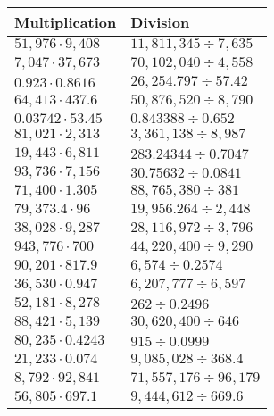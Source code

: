 \begin{longtable}[]{@{}ll@{}}
\toprule
Multiplication & Division\tabularnewline
\midrule
\endhead
\(51,976\cdot9,408\) & \(11,811,345÷7,635\)\tabularnewline
\(7,047\cdot37,673\) & \(70,102,040÷4,558\)\tabularnewline
\(0.923\cdot0.8616\) & \(26,254.797÷57.42\)\tabularnewline
\(64,413\cdot437.6\) & \(50,876,520÷8,790\)\tabularnewline
\(0.03742\cdot53.45\) & \(0.843388÷0.652\)\tabularnewline
\(81,021\cdot2,313\) & \(3,361,138÷8,987\)\tabularnewline
\(19,443\cdot6,811\) & \(283.24344÷0.7047\)\tabularnewline
\(93,736\cdot7,156\) & \(30.75632÷0.0841\)\tabularnewline
\(71,400\cdot1.305\) & \(88,765,380÷381\)\tabularnewline
\(79,373.4\cdot96\) & \(19,956.264÷2,448\)\tabularnewline
\(38,028\cdot 9,287\) & \(28,116,972÷3,796\)\tabularnewline
\(943,776\cdot700\) & \(44,220,400÷9,290\)\tabularnewline
\(90,201\cdot817.9\) & \(6,574÷0.2574\)\tabularnewline
\(36,530\cdot0.947\) & \(6,207,777÷6,597\)\tabularnewline
\(52,181\cdot 8,278\) & \(262÷0.2496\)\tabularnewline
\(88,421\cdot 5,139\) & \(30,620,400÷646\)\tabularnewline
\(80,235\cdot0.4243\) & \(915÷0.0999\)\tabularnewline
\(21,233\cdot0.074\) & \(9,085,028÷368.4\)\tabularnewline
\(8,792\cdot92,841\) & \(71,557,176÷96,179\)\tabularnewline
\(56,805\cdot697.1\) & \(9,444,612÷669.6\)\tabularnewline
\bottomrule
\end{longtable}
